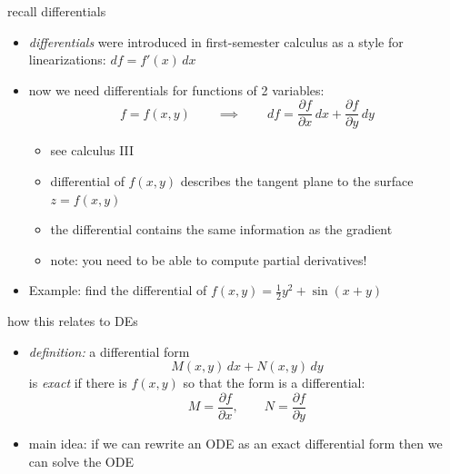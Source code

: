 \documentclass{beamer}
\begin{document}
\begin{frame}{recall differentials}

\begin{itemize}
\item \emph{differentials} were introduced in first-semester calculus as a style for linearizations: $df = f'(x)\,dx$
\item now we need differentials for functions of 2 variables:
    $$f=f(x,y) \qquad \implies \qquad df = \frac{\partial f}{\partial x}\,dx + \frac{\partial f}{\partial y}\,dy$$

\vspace{-2mm}
    \begin{itemize}
    \item see calculus III
    \item differential of $f(x,y)$ describes the tangent plane to the surface $z=f(x,y)$
    \item the differential contains the same information as the gradient
    \item \alert{note:} you need to be able to compute partial derivatives!
    \end{itemize}
\item Example: find the differential of $f(x,y)=\frac{1}{2} y^2 + \sin(x+y)$

\vspace{20mm}
\end{itemize}
\end{frame}


\begin{frame}{how this relates to DEs}

\begin{itemize}
\item \emph{definition:}  a differential form
    $$M(x,y)\,dx + N(x,y)\,dy$$
is \alert{\emph{exact}} if there is $f(x,y)$ so that the form is a differential:
    $$M = \frac{\partial f}{\partial x}, \qquad N = \frac{\partial f}{\partial y}$$
\item \alert{main idea:} if we can rewrite an ODE as an exact differential form then we can solve the ODE
\end{itemize}
\end{frame}
\end{document}
